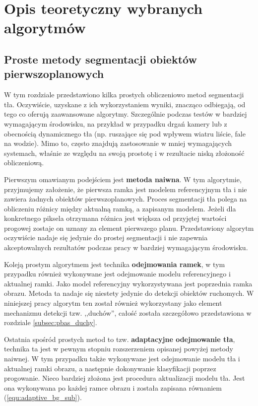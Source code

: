 \chapter{Opis teoretyczny wybranych algorytmów}
\label{cha:opis_teoretyczny_wybranych_algorytmow}

\section{Proste metody segmentacji obiektów pierwszoplanowych}
\label{sec:proste_metody}

W tym rozdziale przedstawiono kilka prostych obliczeniowo metod segmentacji tła. Oczywiście, uzyskane z ich wykorzystaniem wyniki, znacząco odbiegają, od tego co oferują zaawansowane algorytmy. Szczególnie podczas testów w bardziej wymagającym środowisku, na przykład w przypadku drgań kamery lub z obecnością dynamicznego tła (np. ruszające się pod wpływem wiatru liście, fale na wodzie). %
Mimo to, często znajdują zastosowanie w mniej wymagających systemach, właśnie ze względu na swoją prostotę i w rezultacie niską złożoność obliczeniową.

Pierwszym omawianym podejściem jest \textbf{metoda naiwna}. 
W tym algorytmie, przyjmujemy założenie, że pierwsza ramka jest modelem referencyjnym tła i nie zawiera żadnych obiektów pierwszoplanowych. 
Proces segmentacji tła polega na obliczeniu różnicy między aktualną ramką, a zapisanym modelem. 
Jeżeli dla konkretnego piksela otrzymana różnica jest większa od przyjętej wartości progowej zostaje on uznany za element pierwszego planu. 
Przedstawiony algorytm oczywiście nadaje się jedynie do prostej segmentacji i nie zapewnia akceptowalnych rezultatów podczas pracy w bardziej wymagającym środowisku.

Koleją prostym algorytmem jest technika \textbf{odejmowania ramek}, w tym przypadku również wykonywane jest odejmowanie modelu referencyjnego i aktualnej ramki. 
Jako model referencyjny wykorzystywana jest poprzednia ramka obrazu. 
Metoda ta nadaje się niestety jedynie do detekcji obiektów ruchomych. 
W niniejszej pracy algorytm ten został również wykorzystany jako element mechanizmu detekcji tzw. ,,duchów'', całość została szczegółowo przedstawiona w rozdziale \ref{subsec:pbas_duchy}.

Ostatnia spośród prostych metod to tzw. \textbf{adaptacyjne odejmowanie tła}, technika ta jest w pewnym stopniu rozszerzeniem opisanej powyżej metody naiwnej. 
W tym przypadku także wykonywane jest odejmowanie modelu tła i aktualnej ramki obrazu, a następnie dokonywanie klasyfikacji poprzez progowanie. 
Nieco bardziej złożona jest procedura aktualizacji modelu tła. 
Jest ona wykonywana po każdej ramce obrazu i została zapisana równaniem (\ref{equ:adaptive_bg_sub}).

